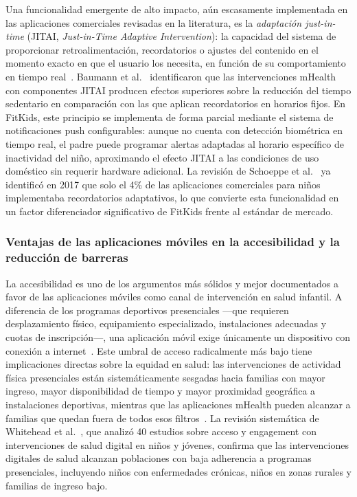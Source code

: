 					Una funcionalidad emergente de alto impacto, aún escasamente implementada en las aplicaciones comerciales revisadas en la literatura, es la \textit{adaptación just-in-time} (JITAI, \textit{Just-in-Time Adaptive Intervention}): la capacidad del sistema de proporcionar retroalimentación, recordatorios o ajustes del contenido en el momento exacto en que el usuario los necesita, en función de su comportamiento en tiempo real~\cite{Baumann2022}. Baumann et al.~\cite{Baumann2022} identificaron que las intervenciones mHealth con componentes JITAI producen efectos superiores sobre la reducción del tiempo sedentario en comparación con las que aplican recordatorios en horarios fijos. En FitKids, este principio se implementa de forma parcial mediante el sistema de notificaciones push configurables: aunque no cuenta con detección biométrica en tiempo real, el padre puede programar alertas adaptadas al horario específico de inactividad del niño, aproximando el efecto JITAI a las condiciones de uso doméstico sin requerir hardware adicional. La revisión de Schoeppe et al.~\cite{Schoeppe2017} ya identificó en 2017 que solo el 4\% de las aplicaciones comerciales para niños implementaba recordatorios adaptativos, lo que convierte esta funcionalidad en un factor diferenciador significativo de FitKids frente al estándar de mercado.

				\subsubsection{Ventajas de las aplicaciones móviles en la accesibilidad y la reducción de barreras}
					La accesibilidad es uno de los argumentos más sólidos y mejor documentados a favor de las aplicaciones móviles como canal de intervención en salud infantil. A diferencia de los programas deportivos presenciales ---que requieren desplazamiento físico, equipamiento especializado, instalaciones adecuadas y cuotas de inscripción---, una aplicación móvil exige únicamente un dispositivo con conexión a internet~\cite{Direito2017}. Este umbral de acceso radicalmente más bajo tiene implicaciones directas sobre la equidad en salud: las intervenciones de actividad física presenciales están sistemáticamente sesgadas hacia familias con mayor ingreso, mayor disponibilidad de tiempo y mayor proximidad geográfica a instalaciones deportivas, mientras que las aplicaciones mHealth pueden alcanzar a familias que quedan fuera de todos esos filtros~\cite{Direito2017,WangJun2024}. La revisión sistemática de Whitehead et al.~\cite{Whitehead2024}, que analizó 40 estudios sobre acceso y engagement con intervenciones de salud digital en niños y jóvenes, confirma que las intervenciones digitales de salud alcanzan poblaciones con baja adherencia a programas presenciales, incluyendo niños con enfermedades crónicas, niños en zonas rurales y familias de ingreso bajo.
					

